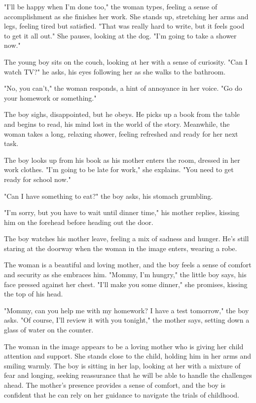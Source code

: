 \documentclass[smalldemyvopaper,11pt,twoside,onecolumn,openright,extrafontsizes]{memoir}
\begin{document}
"I'll be happy when I'm done too," the woman types, feeling a sense of accomplishment as she finishes her work. She stands up, stretching her arms and legs, feeling tired but satisfied. "That was really hard to write, but it feels good to get it all out." She pauses, looking at the dog. "I'm going to take a shower now."\par
The young boy sits on the couch, looking at her with a sense of curiosity. "Can I watch TV?" he asks, his eyes following her as she walks to the bathroom.\par
"No, you can't," the woman responds, a hint of annoyance in her voice. "Go do your homework or something."\par
The boy sighs, disappointed, but he obeys. He picks up a book from the table and begins to read, his mind lost in the world of the story. Meanwhile, the woman takes a long, relaxing shower, feeling refreshed and ready for her next task.\par
The boy looks up from his book as his mother enters the room, dressed in her work clothes. "I'm going to be late for work," she explains. "You need to get ready for school now."\par
"Can I have something to eat?" the boy asks, his stomach grumbling.\par
"I'm sorry, but you have to wait until dinner time," his mother replies, kissing him on the forehead before heading out the door.\par
The boy watches his mother leave, feeling a mix of sadness and hunger. He's still staring at the doorway when the woman in the image enters, wearing a robe.\par
The woman is a beautiful and loving mother, and the boy feels a sense of comfort and security as she embraces him. "Mommy, I'm hungry," the little boy says, his face pressed against her chest. "I'll make you some dinner," she promises, kissing the top of his head.\par
"Mommy, can you help me with my homework? I have a test tomorrow," the boy asks. "Of course, I'll review it with you tonight," the mother says, setting down a glass of water on the counter.\par
The woman in the image appears to be a loving mother who is giving her child attention and support. She stands close to the child, holding him in her arms and smiling warmly. The boy is sitting in her lap, looking at her with a mixture of fear and longing, seeking reassurance that he will be able to handle the challenges ahead. The mother's presence provides a sense of comfort, and the boy is confident that he can rely on her guidance to navigate the trials of childhood.\par
\end{document}
